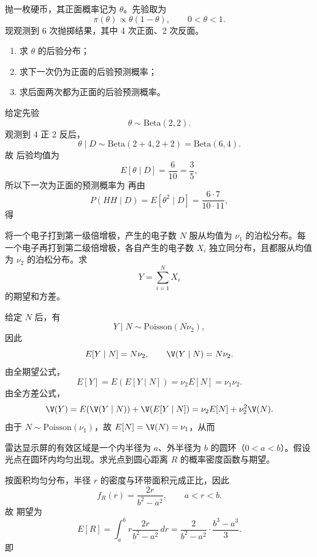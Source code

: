 \begin{question}
抛一枚硬币，其正面概率记为 $\theta$。先验取为
\[
\pi(\theta)\propto \theta(1-\theta),\qquad 0<\theta<1.
\]
现观测到 6 次抛掷结果，其中 4 次正面、2 次反面。
\begin{enumerate}
\item 求 $\theta$ 的后验分布；
\item 求下一次仍为正面的后验预测概率；
\item 求后面两次都为正面的后验预测概率。
\end{enumerate}
\begin{solution}
给定先验
\[
\theta\sim \mathrm{Beta}(2,2).
\]
观测到 4 正 2 反后，
\[
\theta\mid D\sim \mathrm{Beta}(2+4,2+2)=\mathrm{Beta}(6,4).
\]
故
后验均值为
\[
E[\theta\mid D]=\frac{6}{10}=\frac35,
\]
所以下一次为正面的预测概率为
再由
\[
P(HH\mid D)=E[\theta^2\mid D]
=\frac{6\cdot 7}{10\cdot 11},
\]
得
\end{solution}
\end{question}

\begin{question}
将一个电子打到第一级倍增极，产生的电子数 $N$ 服从均值为 $\nu_1$ 的泊松分布。每一个电子再打到第二级倍增极，各自产生的电子数 $X_i$ 独立同分布，且都服从均值为 $\nu_2$ 的泊松分布。求
\[
Y=\sum_{i=1}^{N}X_i
\]
的期望和方差。
\begin{solution}
给定 $N$ 后，有
\[
Y\mid N\sim \mathrm{Poisson}(N\nu_2),
\]
因此
\[
E[Y\mid N]=N\nu_2,\qquad \V(Y\mid N)=N\nu_2.
\]
由全期望公式，
\[
E[Y]=E(E[Y\mid N])=\nu_2E[N]=\nu_1\nu_2.
\]
由全方差公式，
\[
\V(Y)=E(\V(Y\mid N))+\V(E[Y\mid N])
=\nu_2E[N]+\nu_2^2\V(N).
\]
由于 $N\sim \mathrm{Poisson}(\nu_1)$，故 $E[N]=\V(N)=\nu_1$，从而
\end{solution}
\end{question}

\begin{question}
雷达显示屏的有效区域是一个内半径为 $a$、外半径为 $b$ 的圆环（$0<a<b$）。假设光点在圆环内均匀出现。求光点到圆心距离 $R$ 的概率密度函数与期望。
\begin{solution}
按面积均匀分布，半径 $r$ 的密度与环带面积元成正比，因此
\[
f_R(r)=\frac{2r}{b^2-a^2},\qquad a<r<b.
\]
故
期望为
\[
E[R]=\int_a^b r\frac{2r}{b^2-a^2}\,dr
=\frac{2}{b^2-a^2}\cdot \frac{b^3-a^3}{3}.
\]
即
\end{solution}
\end{question}

